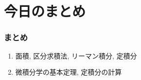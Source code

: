 \documentclass[dvipdfmx,cjk,10.2pt]{beamer}
\theoremstyle{definition}
\begin{document}












\section{今日のまとめ}
\begin{frame}
\frametitle{まとめ}   


\begin{enumerate}
\item 面積, 区分求積法, リーマン積分, 定積分
\item 微積分学の基本定理, 定積分の計算
\end{enumerate} 


\end{frame}
\end{document}
